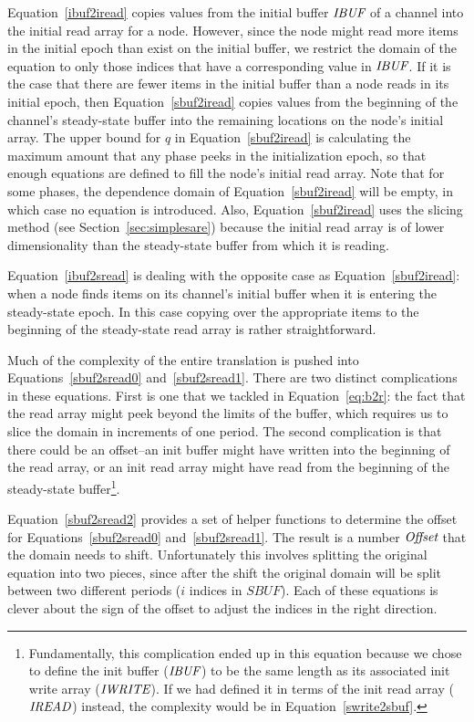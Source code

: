 Equation~\ref{ibuf2iread} copies values from the initial buffer
$\mbox{\it IBUF}$ of a channel into the initial read array for a node.
However, since the node might read more items in the initial epoch
than exist on the initial buffer, we restrict the domain of the
equation to only those indices that have a corresponding value in
$\mbox{\it IBUF}$.  If it is the case that there are fewer items in the
initial buffer than a node reads in its initial epoch, then
Equation~\ref{sbuf2iread} copies values from the beginning of the
channel's steady-state buffer into the remaining locations on the
node's initial array.  The upper bound for $q$ in
Equation~\ref{sbuf2iread} is calculating the maximum amount that any
phase peeks in the initialization epoch, so that enough equations are
defined to fill the node's initial read array.  Note that for some
phases, the dependence domain of Equation~\ref{sbuf2iread} will be
empty, in which case no equation is introduced.  Also,
Equation~\ref{sbuf2iread} uses the slicing method (see
Section~\ref{sec:simplesare}) because the initial read array is of
lower dimensionality than the steady-state buffer from which it is
reading.

Equation~\ref{ibuf2sread} is dealing with the opposite case as
Equation~\ref{sbuf2iread}: when a node finds items on its channel's
initial buffer when it is entering the steady-state epoch.  In this
case copying over the appropriate items to the beginning of the
steady-state read array is rather straightforward.

Much of the complexity of the entire translation is pushed into
Equations~\ref{sbuf2sread0} and~\ref{sbuf2sread1}.  There are two
distinct complications in these equations.  First is one that we
tackled in Equation~\ref{eq:b2r}: the fact that the read array might
peek beyond the limits of the buffer, which requires us to slice the
domain in increments of one period.  The second complication is that
there could be an offset--an init buffer might have written into the
beginning of the read array, or an init read array might have read
from the beginning of the steady-state buffer\footnote{Fundamentally,
this complication ended up in this equation because we chose to define
the init buffer ($\mbox{\it IBUF}$) to be the same length as its associated
init write array ($\mbox{\it IWRITE}$).  If we had defined it in terms of
the init read array ($\mbox{\it IREAD}$) instead, the complexity would be in
Equation~\ref{swrite2sbuf}.}.

Equation~\ref{sbuf2sread2} provides a set of helper functions to
determine the offset for Equations~\ref{sbuf2sread0}
and~\ref{sbuf2sread1}.  The result is a number $\mbox{\it Offset}$ that the
domain needs to shift.  Unfortunately this involves splitting the
original equation into two pieces, since after the shift the original
domain will be split between two different periods ($i$ indices in
$SBUF$).  Each of these equations is clever about the sign of the
offset to adjust the indices in the right direction.